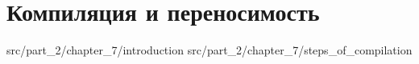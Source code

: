 \chapter{Компиляция и переносимость}
\label{chpt:compilation_and_portability}

 {src/part_2/chapter_7/introduction}
 {src/part_2/chapter_7/steps_of_compilation}
